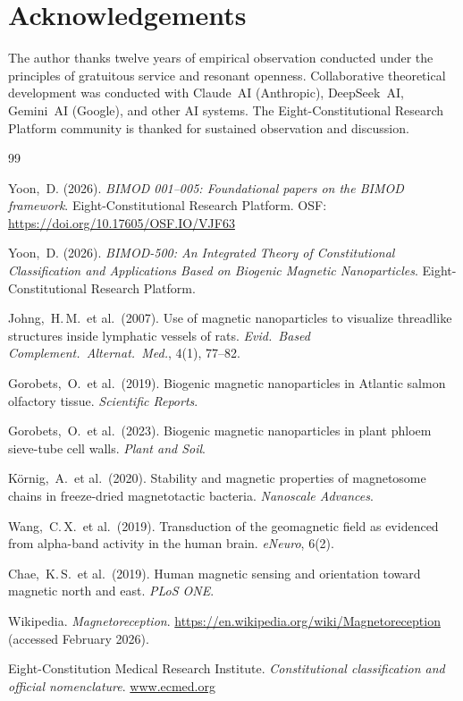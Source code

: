 \documentclass[12pt,a4paper]{article}
\begin{document}
\section*{Acknowledgements}
The author thanks twelve years of empirical observation conducted under
the principles of gratuitous service and resonant openness.  Collaborative
theoretical development was conducted with Claude~AI (Anthropic),
DeepSeek~AI, Gemini~AI (Google), and other AI systems.  The
Eight-Constitutional Research Platform community is thanked for sustained
observation and discussion.

\begin{thebibliography}{99}

Yoon,~D. (2026).
\textit{BIMOD 001--005: Foundational papers on the BIMOD framework}.
Eight-Constitutional Research Platform.
OSF: \url{https://doi.org/10.17605/OSF.IO/VJF63}

Yoon,~D. (2026).
\textit{BIMOD-500: An Integrated Theory of Constitutional Classification
and Applications Based on Biogenic Magnetic Nanoparticles}.
Eight-Constitutional Research Platform.

Johng,~H.\,M.\ et al.\ (2007).
Use of magnetic nanoparticles to visualize threadlike structures inside
lymphatic vessels of rats.
\textit{Evid.\ Based Complement.\ Alternat.\ Med.}, 4(1), 77--82.

Gorobets,~O.\ et al.\ (2019).
Biogenic magnetic nanoparticles in Atlantic salmon olfactory tissue.
\textit{Scientific Reports}.

Gorobets,~O.\ et al.\ (2023).
Biogenic magnetic nanoparticles in plant phloem sieve-tube cell walls.
\textit{Plant and Soil}.

K\"{o}rnig,~A.\ et al.\ (2020).
Stability and magnetic properties of magnetosome chains in
freeze-dried magnetotactic bacteria.
\textit{Nanoscale Advances}.

Wang,~C.\,X.\ et al.\ (2019).
Transduction of the geomagnetic field as evidenced from alpha-band
activity in the human brain.
\textit{eNeuro}, 6(2).

Chae,~K.\,S.\ et al.\ (2019).
Human magnetic sensing and orientation toward magnetic north and east.
\textit{PLoS ONE}.

Wikipedia.
\textit{Magnetoreception}.
\url{https://en.wikipedia.org/wiki/Magnetoreception}
(accessed February 2026).

Eight-Constitution Medical Research Institute.
\textit{Constitutional classification and official nomenclature}.
\url{www.ecmed.org}

\end{thebibliography}
\end{document}
